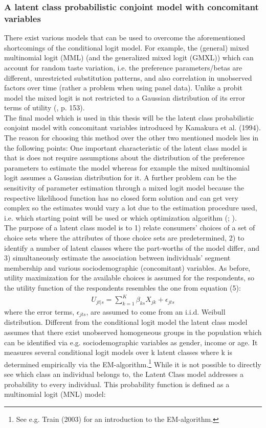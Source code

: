 \documentclass[12pt, abstracton]{article}
\begin{document}
\subsubsection{A latent class probabilistic conjoint model with concomitant variables}
\label{lc_model}
There exist various models that can be used to overcome the aforementioned shortcomings of the conditional logit model. For example, the (general) mixed multinomial logit (MML) (and the generalized mixed logit (GMXL)) which can account for random taste variation, i.e. the preference parameters/betas are different, unrestricted substitution patterns, and also correlation in unobserved factors over time (rather a problem when using panel data). Unlike a probit model the mixed logit is not restricted to a Gaussian distribution of its error terms of utility (\cite{Train2003}, p. 153).\\
The final model which is used in this thesis will be the latent class probabilistic conjoint model with concomitant variables introduced by Kamakura et al. (1994). The reason for choosing this method over the other two mentioned models lies in the following points: One important characteristic of the latent class model is that is does not require assumptions about the distribution of the preference parameters to estimate the model whereas for example the mixed multinomial logit assumes a Gaussian distribution for it. A further problem can be the sensitivity of parameter estimation through a mixed logit model because the respective likelihood function has no closed form solution and can get very complex so the estimates would vary a lot due to the estimation procedure used, i.e. which starting point will be used or which optimization algorithm (\cite{Chang2011}; \cite{Chiou2007}).\\
The purpose of a latent class model is to 1) relate consumers’ choices of a set of choice sets where the attributes of those choice sets are predetermined, 2) to identify a number of latent classes where the part-worths of the model differ, and 3) simultaneously estimate the association between individuals’ segment membership and various sociodemographic (concomitant) variables. As before, utility maximization for the available choices is assumed for the respondents, so the utility function of the respondents resembles the one from equation (5):
\begin{align}
U_{jt|s}=\sum_{k=1}^{K} {\beta_{ks} X_{jk}} + \epsilon_{jts}
\end{align}
where the error terms, $\epsilon_{jts}$, are assumed to come from an i.i.d. Weibull distribution. Different from the conditional logit model the latent class model assumes that there exist unobserved homogeneous groups in the population which can be identified via e.g. sociodemographic variables as gender, income or age. It measures several conditional logit models over k latent classes where k is determined empirically via the EM-algorithm.\footnote{See e.g. Train (2003) for an introduction to the EM-algorithm.} While it is not possible to directly see which class an individual belongs to, the Latent Class model addresses a probability to every individual. This probability function is defined as a multinomial logit (MNL) model:
\end{document}
